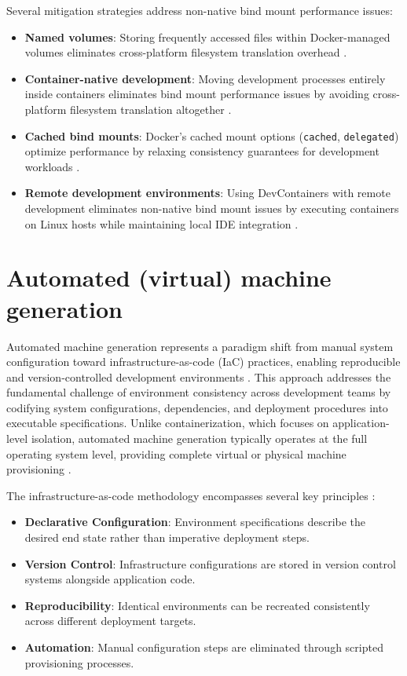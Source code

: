 Several mitigation strategies address non-native bind mount performance issues:
\begin{itemize}
    \item \textbf{Named volumes}: Storing frequently accessed files within Docker-managed volumes eliminates cross-platform filesystem translation overhead \citep{dockerDockerReferenceDocumentation2025}.
    \item \textbf{Container-native development}: Moving development processes entirely inside containers eliminates bind mount performance issues by avoiding cross-platform filesystem translation altogether \citep{microsoftDevelopingContainer2025}.
    \item \textbf{Cached bind mounts}: Docker's cached mount options (\texttt{cached}, \texttt{delegated}) optimize performance by relaxing consistency guarantees for development workloads \citep{dockerDockerReferenceDocumentation2025}.
    \item \textbf{Remote development environments}: Using DevContainers with remote development eliminates non-native bind mount issues by executing containers on Linux hosts while maintaining local IDE integration \citep{microsoftDevelopingContainer2025}.
\end{itemize}

\section{Automated (virtual) machine generation}
Automated machine generation represents a paradigm shift from manual system configuration toward infrastructure-as-code (IaC) practices, enabling reproducible and version-controlled development environments \citep{humbleContinuousDeliveryReliable2011,nemethUNIXLinuxSystem2017}.
This approach addresses the fundamental challenge of environment consistency across development teams by codifying system configurations, dependencies, and deployment procedures into executable specifications.
Unlike containerization, which focuses on application-level isolation, automated machine generation typically operates at the full operating system level, providing complete virtual or physical machine provisioning \citep{portnoyVirtualizationEssentials2016}.

The infrastructure-as-code methodology encompasses several key principles \citep{humbleContinuousDeliveryReliable2011,forsgrenAccelerate2018}:
\begin{itemize}
    \item \textbf{Declarative Configuration}: Environment specifications describe the desired end state rather than imperative deployment steps.
    \item \textbf{Version Control}: Infrastructure configurations are stored in version control systems alongside application code.
    \item \textbf{Reproducibility}: Identical environments can be recreated consistently across different deployment targets.
    \item \textbf{Automation}: Manual configuration steps are eliminated through scripted provisioning processes.
\end{itemize}

